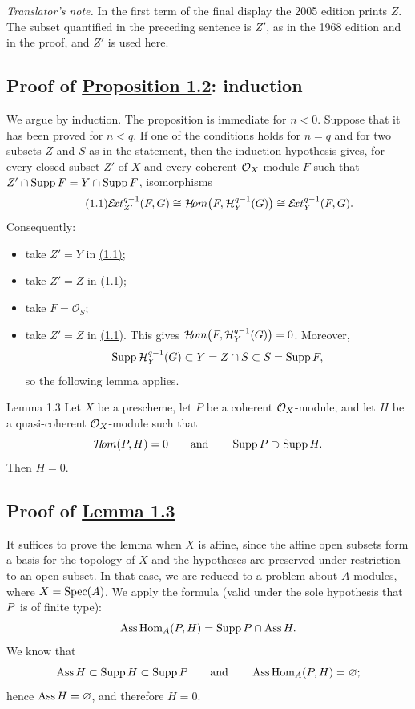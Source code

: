 \noindent\textit{Translator's note.} In the first term of the final display
the 2005 edition prints $Z$. The subset quantified in the preceding sentence
is $Z'$, as in the 1968 edition and in the proof, and $Z'$ is used here.

\subsection*{Proof of \hyperref[VII.1.2]{Proposition 1.2}: induction}

We argue by induction. The proposition is immediate for $n<0$. Suppose that it
has been proved for $n<q$. If one of the conditions holds for $n=q$ and for two
subsets $Z$ and $S$ as in the statement, then the induction hypothesis gives,
for every closed subset $Z'$ of $X$ and every coherent $\OX$-module $F$ such
that $Z'\cap\Supp F=Y\cap\Supp F$, isomorphisms
\begin{equation}\tag{1.1}\label{eq:VII.1.1}
  \SheafExt_{Z'}^{q-1}(F,G)
  \cong\SheafHom\bigl(F,\SheafH_Y^{q-1}(G)\bigr)
  \cong\SheafExt_Y^{q-1}(F,G).
\end{equation}
Consequently:
\begin{itemize}
  \item[(i)$\Rightarrow$(iv)] take $Z'=Y$ in \hyperref[eq:VII.1.1]{(1.1)};
  \item[(iv)$\Rightarrow$(iii)] take $Z'=Z$ in \hyperref[eq:VII.1.1]{(1.1)};
  \item[(iii)$\Rightarrow$(ii)] take $F=\mathcal O_S$;
  \item[(ii)$\Rightarrow$(i)] take $Z'=Z$ in \hyperref[eq:VII.1.1]{(1.1)}. This gives
  $\SheafHom\bigl(F,\SheafH_Y^{q-1}(G)\bigr)=0$. Moreover,
  \[
    \Supp\SheafH_Y^{q-1}(G)
    \subset Y=Z\cap S\subset S=\Supp F,
  \]
  so the following lemma applies.
\end{itemize}

\begin{sgastatement}{Lemma 1.3}
Let $X$ be a prescheme, let $P$ be a coherent $\OX$-module, and let $H$ be a
quasi-coherent $\OX$-module such that
\[
  \SheafHom(P,H)=0
  \qquad\text{and}\qquad
  \Supp P\supset\Supp H.
\]
Then $H=0$.
\end{sgastatement}

\subsection*{Proof of \hyperref[VII.1.3]{Lemma 1.3}}
It suffices to prove the lemma when $X$ is affine, since the affine open
subsets form a basis for the topology of $X$ and the hypotheses are preserved
under restriction to an open subset. In that case, we are reduced to a problem
about $A$-modules, where $X=\Spec(A)$. We apply the formula (valid under the
sole hypothesis that $\sisi{M}{P}$ is of finite type):
\[
  \Assop\Homop_A(P,H)=\Supp P\cap\Assop H.
\]
We know that
\[
  \Assop H\subset\Supp H\subset\Supp P
  \qquad\text{and}\qquad
  \Assop\Homop_A(P,H)=\varnothing;
\]
hence $\Assop H=\varnothing$, and therefore $H=0$.

